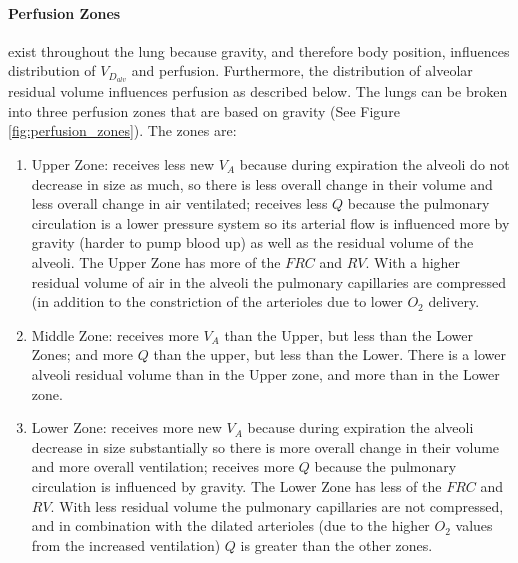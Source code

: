 \paragraph{Perfusion Zones} exist throughout the lung because gravity, and therefore body position, influences distribution of $V_D_{alv}$ and perfusion. Furthermore, the distribution of alveolar residual volume influences perfusion as described below. The lungs can be broken into three perfusion zones that are based on gravity (See Figure \ref{fig:perfusion_zones}).
\vspace{2mm}
The zones are:
\begin{enumerate}
    \item Upper Zone: receives less new $V_A$ because during expiration the alveoli do not decrease in size as much, so there is less overall change in their volume and less overall change in air ventilated; receives less $Q$ because the pulmonary circulation is a lower pressure system so its arterial flow is influenced more by gravity (harder to pump blood up) as well as the residual volume of the alveoli. The Upper Zone has more of the $FRC$ and $RV$. With a higher residual volume of air in the alveoli the pulmonary capillaries are compressed (in addition to the constriction of the arterioles due to lower $O_2$ delivery.
    \item Middle Zone: receives more $V_A$ than the Upper, but less than the Lower Zones; and more $Q$ than the upper, but less than the Lower. There is a lower alveoli residual volume than in the Upper zone, and more than in the Lower zone.
    \item Lower Zone: receives more new $V_A$ because during expiration the alveoli decrease in size substantially so there is more overall change in their volume and more overall ventilation; receives more $Q$ because the pulmonary circulation is influenced by gravity. The Lower Zone has less of the $FRC$ and $RV$. With less residual volume the pulmonary capillaries are not compressed, and in combination with the dilated arterioles (due to the higher $O_2$ values from the increased ventilation) $Q$ is greater than the other zones.
\end{enumerate}
\vspace{3mm}

